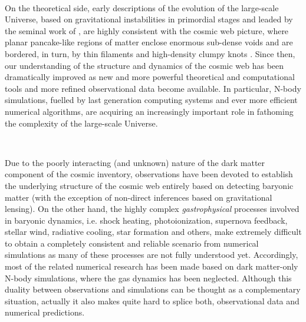 \documentclass[a4,useAMS,usenatbib,usegraphicx,12pt]{article}
\begin{document}
\

On the theoretical side, early descriptions of the evolution of the large-scale 
Universe, based on gravitational instabilities in primordial stages and leaded 
by the seminal work of \citet{Zeldovich70}, are highly consistent with the 
cosmic web picture, where planar pancake-like regions of matter enclose enormous
sub-dense voids and are bordered, in turn, by thin filaments and high-density 
clumpy knots \citep{Bond96}. Since then, our understanding of the structure and 
dynamics of the cosmic web has been dramatically improved as new and more 
powerful theoretical and computational tools and more refined observational data 
become available. In particular, N-body simulations, fuelled by last generation 
computing systems and ever more efficient numerical algorithms, are acquiring 
an increasingly important role in fathoming the complexity of the large-scale 
Universe.

\

Due to the poorly interacting (and unknown) nature of the dark matter component 
of the  cosmic inventory, observations have been devoted to establish the 
underlying structure of the cosmic web entirely based on detecting baryonic 
matter (with the exception of non-direct inferences based on gravitational 
lensing). On the other hand, the highly complex \textit{gastrophysical} 
processes involved in baryonic dynamics, i.e. shock heating, photoionization, 
supernova feedback, stellar wind, radiative cooling, star formation and others, 
make extremely difficult to obtain a completely consistent and reliable scenario 
from numerical simulations as many of these processes are not fully understood 
yet. Accordingly, most of the related numerical research has been made based on 
dark matter-only N-body simulations, where the gas dynamics has been neglected.
Although this duality between observations and simulations can be thought as a 
complementary situation, actually it also makes quite hard to splice both, 
observational data and numerical predictions.

\
\end{document}
